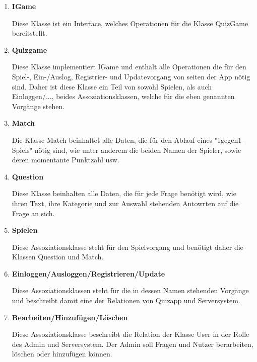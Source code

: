 \begin{enumerate}
	\item{\textbf{IGame}}
	
	Diese Klasse ist ein Interface, welches Operationen für die Klasse QuizGame bereitstellt.
	
	\item{\textbf{Quizgame}}
	
	Diese Klasse implementiert IGame und enthält alle Operationen die für den Spiel-, Ein-/Auslog, Registrier- und Updatevorgang von seiten der App
	nötig sind. Daher ist diese Klasse ein Teil von sowohl Spielen, als auch Einloggen/..., beides Assoziationsklassen, welche für die eben genannten Vorgänge
	stehen.
	
	\item{\textbf{Match}}
	
	Die Klasse Match beinhaltet alle Daten, die für den Ablauf eines "1gegen1-Spiels" nötig sind, wie unter anderem die beiden Namen der Spieler, sowie deren momentante Punktzahl usw.
	
	\item{\textbf{Question}}
	
	Diese Klasse beinhalten alle Daten, die für jede Frage benötigt wird, wie ihren Text, ihre Kategorie und zur Auswahl stehenden Antowrten auf die Frage an sich.
	
	\item{\textbf{Spielen}}
	
	Diese Assoziationsklasse steht für den Spielvorgang und benötigt daher die Klassen Question und Match. 
	
	\item{\textbf{Einloggen/Ausloggen/Registrieren/Update}}
	
	Diese Assoziationsklassen steht für die in dessen Namen stehenden Vorgänge und beschreibt damit eine der Relationen von Quizapp und Serversystem.
	
	\item{\textbf{Bearbeiten/Hinzufügen/Löschen}}
	
	Diese Assoziationsklasse beschreibt die Relation der Klasse User in der Rolle des Admin und	Serversystem. Der Admin soll Fragen und Nutzer berarbeiten, löschen 
	oder hinzufügen können.
	
\end{enumerate}